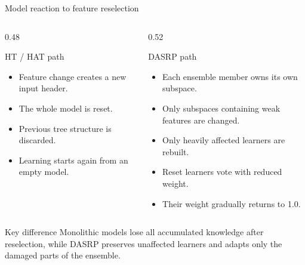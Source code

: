 \documentclass[aspectratio=169,xcolor=dvipsnames]{beamer}
\begin{document}
\begin{frame}{Model reaction to feature reselection}
\begin{columns}[T]
    \begin{column}{0.48\textwidth}
        \begin{block}{HT / HAT path}
        \small
        \begin{itemize}
            \item Feature change creates a new input header.
            \item The whole model is reset.
            \item Previous tree structure is discarded.
            \item Learning starts again from an empty model.
        \end{itemize}
        \end{block}
    \end{column}

    \begin{column}{0.52\textwidth}
        \begin{block}{DASRP path}
        \small
        \begin{itemize}
            \item Each ensemble member owns its own subspace.
            \item Only subspaces containing weak features are changed.
            \item Only heavily affected learners are rebuilt.
            \item Reset learners vote with reduced weight.
            \item Their weight gradually returns to 1.0.
        \end{itemize}
        \end{block}
    \end{column}
\end{columns}

\vspace{0.2cm}
\begin{block}{Key difference}
\small
Monolithic models lose all accumulated knowledge after reselection, while DASRP preserves unaffected learners and adapts only the damaged parts of the ensemble.
\end{block}
\end{frame}
\end{document}
